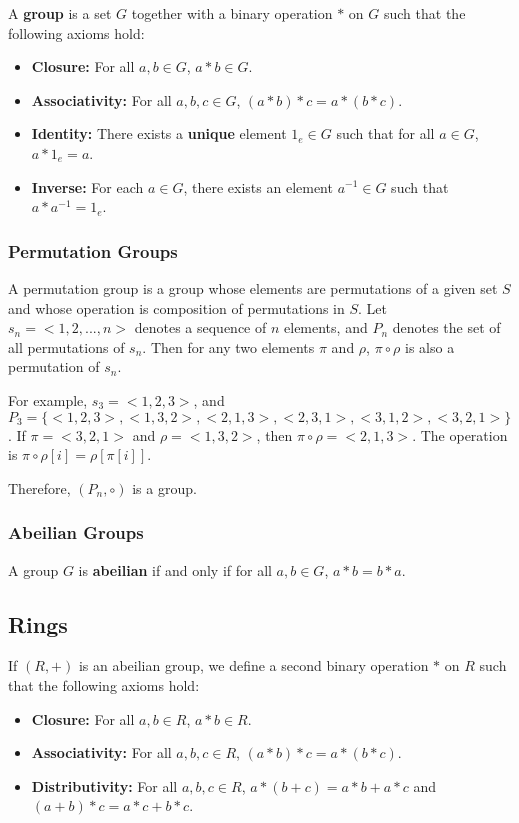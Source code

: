 \documentclass[a4paper,12pt]{article}
\begin{document}
A \textbf{group} is a set $G$ together with a binary operation $*$ on $G$ such that the following axioms hold:
\begin{itemize}
	\item \textbf{Closure:} For all $a,b \in G$, $a*b \in G$.
	\item \textbf{Associativity:} For all $a,b,c \in G$, $(a*b)*c = a*(b*c)$.
	\item \textbf{Identity:} There exists a \textbf{unique} element $1_e \in G$ such that for all $a \in G$, $a*1_e = a$.
	\item \textbf{Inverse:} For each $a \in G$, there exists an element $a^{-1} \in G$ such that $a*a^{-1} = 1_e$.
\end{itemize}

\subsubsection{Permutation Groups}

A permutation group is a group whose elements are permutations of a given set $S$ and whose operation is composition of permutations in $S$.
Let $s_n = <1,2,...,n>$ denotes a sequence of $n$ elements, and $P_n$ denotes the set of all permutations of $s_n$.
Then for any two elements $\pi$ and $\rho$, $\pi \circ \rho$ is also a permutation of $s_n$.

For example, $s_3 = <1,2,3>$, and $P_3 = \{<1,2,3>, <1,3,2>, <2,1,3>, <2,3,1>, <3,1,2>, <3,2,1>\}$.
If $\pi = <3,2,1>$ and $\rho = <1,3,2>$, then $\pi \circ \rho = <2,1,3>$.
The operation is $\pi \circ \rho [i] = \rho[\pi[i]]$.

Therefore, $(P_n, \circ)$ is a group.

\subsubsection{Abeilian Groups}

A group $G$ is \textbf{abeilian} if and only if for all $a,b \in G$, $a*b = b*a$.

\subsection{Rings}

If $(R,+)$ is an abeilian group, we define a second binary operation $*$ on $R$ such that the following axioms hold:
\begin{itemize}
	\item \textbf{Closure:} For all $a,b \in R$, $a*b \in R$.
	\item \textbf{Associativity:} For all $a,b,c \in R$, $(a*b)*c = a*(b*c)$.
	\item \textbf{Distributivity:} For all $a,b,c \in R$, $a*(b+c) = a*b + a*c$ and $(a+b)*c = a*c + b*c$.
\end{itemize}
\end{document}
